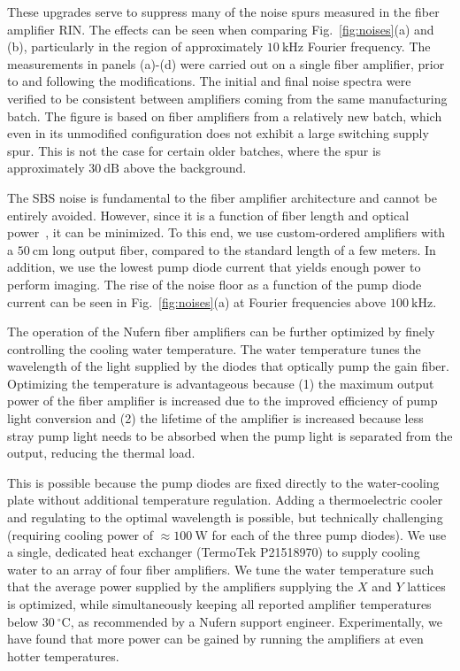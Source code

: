 \documentclass[twocolumn,aps,pra,showpacs,preprintnumbers,bibnotes]{revtex4-1}
\newcommand\unit[2]{\ensuremath{#1~\mathrm{{#2}}}}
\begin{document}
These upgrades serve to suppress many of the noise spurs measured in the fiber amplifier RIN.
The effects can be seen when comparing Fig.~\ref{fig:noises}(a) and (b), particularly in the region of approximately \unit{10}{kHz} Fourier frequency.
The measurements in panels (a)-(d) were carried out on a single fiber amplifier, prior to and following the modifications. The initial and final noise spectra were verified to be consistent between amplifiers coming from the same manufacturing batch.
The figure is based on fiber amplifiers from a relatively new batch, which even in its unmodified configuration does not exhibit a large switching supply spur.
This is not the case for certain older batches, where the spur is approximately \unit{30}{dB} above the background.

The SBS noise is fundamental to the fiber amplifier architecture and cannot be entirely avoided. However, since it is a function of fiber length and optical power~\cite{Agrawal2013}, it can be minimized. To this end, we use custom-ordered amplifiers with a \unit{50}{cm} long output fiber, compared to the standard length of a few meters.
In addition, we use the lowest pump diode current that yields enough power to perform imaging.
The rise of the noise floor as a function of the pump diode current can be seen in Fig.~\ref{fig:noises}(a) at Fourier frequencies above \unit{100}{kHz}.

The operation of the Nufern fiber amplifiers can be further optimized by finely controlling the cooling water temperature.
The water temperature tunes the wavelength of the light supplied by the diodes that optically pump the gain fiber.
Optimizing the temperature is advantageous because (1) the maximum output power of the fiber amplifier is increased due to the improved efficiency of pump light conversion and (2) the lifetime of the amplifier is increased because less stray pump light needs to be absorbed when the pump light is separated from the output, reducing the thermal load.

This is possible because the pump diodes are fixed directly to the water-cooling plate without additional temperature regulation.
Adding a thermoelectric cooler and regulating to the optimal wavelength is possible, but technically challenging (requiring cooling power of $\approx$\unit{100}{W} for each of the three pump diodes).
We use a single, dedicated heat exchanger (TermoTek P21518970) to supply cooling water to an array of four fiber amplifiers.
We tune the water temperature such that the average power supplied by the amplifiers supplying the $X$ and $Y$ lattices is optimized, while simultaneously keeping all reported amplifier temperatures below \unit{30}{^\circ{}C}, as recommended by a Nufern support engineer.
Experimentally, we have found that more power can be gained by running the amplifiers at even hotter temperatures.
\end{document}
